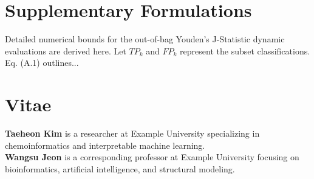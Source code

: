 \documentclass[preprint,12pt,authoryear]{elsarticle}
\begin{document}
\section{Supplementary Formulations}
\label{sec:appendix_a}
Detailed numerical bounds for the out-of-bag Youden's J-Statistic dynamic evaluations are derived here. Let $TP_k$ and $FP_k$ represent the subset classifications. Eq. (A.1) outlines...

\section*{Vitae}
\textbf{Taeheon Kim} is a researcher at Example University specializing in chemoinformatics and interpretable machine learning. \\
\textbf{Wangsu Jeon} is a corresponding professor at Example University focusing on bioinformatics, artificial intelligence, and structural modeling.



\end{document}
